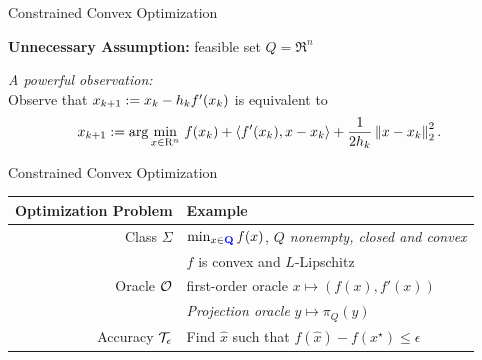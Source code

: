 \documentclass[9pt]{beamer}
\begin{document}
\begin{frame}{Constrained Convex Optimization}

  \textbf{Unnecessary Assumption:} feasible set $Q=\Re^n$

  \vfill

  \emph{A powerful observation: }\\
  Observe that $x_{k+1}\defn x_k - h_k f'(x_k)$ is equivalent to
  \[
    x_{k+1}\defn \arg\min_{x\in\Re^n}\, f(x_k) + \iprod{f'(x_k)}{x-x_k} + \frac{1}{2 h_k} \norm{x-x_k}^2_2.
  \]


  \vfill


\end{frame}


\begin{frame}{Constrained Convex Optimization}

  \begin{center}
    \begin{tabular}{r|l}
      \hline
      Optimization Problem & Example \\[0.5em]
      \hline
      Class $\Sigma$ & $\min_{x\in \emph{Q}} f(x)$, \emph{$Q$ nonempty, closed and convex} \\[0.5em]
                           & $f$ is convex and $L$-Lipschitz\\[0.5em]
      Oracle $\mc O$ & first-order oracle $x\mapsto (f(x), f'(x))$\\[0.5em]
      & \emph{Projection oracle} $y \mapsto \pi_Q(y)$ \\[0.5em]
      Accuracy $\mc T_\epsilon$ & Find $\hat x$ such that $f(\hat x)-f(x^\star)\leq\epsilon$\\[0.5em]
      \hline
    \end{tabular}
  \end{center}

\end{frame}
\end{document}
